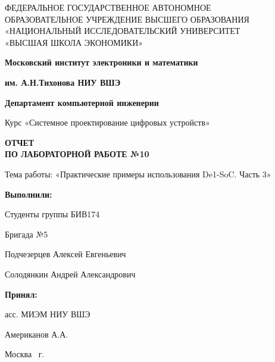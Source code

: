 \begin{titlepage}
	\begin{center}
 		ФЕДЕРАЛЬНОЕ  ГОСУДАРСТВЕННОЕ АВТОНОМНОЕ \\
		ОБРАЗОВАТЕЛЬНОЕ УЧРЕЖДЕНИЕ ВЫСШЕГО ОБРАЗОВАНИЯ\\
		«НАЦИОНАЛЬНЫЙ ИССЛЕДОВАТЕЛЬСКИЙ УНИВЕРСИТЕТ\\
		«ВЫСШАЯ ШКОЛА ЭКОНОМИКИ»
	\end{center}
	
	\begin{center}
		\textbf{Московский институт электроники и математики}
		
		\textbf{им. А.Н.Тихонова НИУ ВШЭ}
		
		\vspace{2ex}
		
		\textbf{Департамент компьютерной инженерии}
	\end{center}
	\vspace{1ex}	
	
	\begin{center}
		Курс «Системное проектирование цифровых устройств»
	\end{center}	
	
	
	\begin{center}
	\textbf{ОТЧЕТ\\
		ПО ЛАБОРАТОРНОЙ РАБОТЕ №10
	}
	\end{center}	

	\begin{center}
		Тема работы: «Практические примеры использования De1-SoC. Часть 3»
	\end{center}

	\vspace{2ex}

	\begin{flushright}
		\textbf{Выполнили:}
		
		\vspace{2ex}
		
		Студенты группы БИВ174
		
		Бригада №5
		
		\vspace{2ex}
		
		Подчезерцев Алексей Евгеньевич
		
		Солодянкин Андрей Александрович
		\vspace{2ex}
		
		\textbf{Принял:}
		
		асс. МИЭМ НИУ ВШЭ
		
		Американов А.А.
		
	\end{flushright}

	\vfill
	\begin{center}
		Москва \the\year \, г.
	\end{center}
	
\end{titlepage}
\addtocounter{page}{1}
